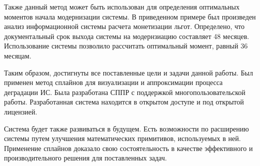 Также данный метод может быть использован для определения оптимальных моментов начала модернизации системы.
В приведенном примере был произведен анализ информационной системы расчета монетизации льгот.
Определено, что документальный срок выхода системы на модернзиацию составляет 48 месяцев.
Использование системы позволило рассчитать оптимальный момент, равный 36 месяцам.


Таким образом, достигнуты все поставленные цели и задачи данной работы. 
Был применен метод сплайнов для визуализации и аппроксимации процесса деградации ИС. 
Была разработана СППР с поддержкой многопользовательской работы. 
Разработанная система находится в открытом доступе и под открытой лицензией.

Система будет также развиваться в будущем. 
Есть возможности по расширению системы путем улучшения математических примитивов, используемых в ней.  
Применение сплайнов доказало свою состоятельность в качестве эффективного и производительного решения для поставленных задач.








\clearpage
